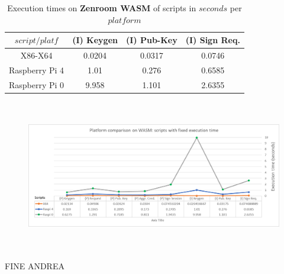 \documentclass[twocolumn]{article}
\begin{document}
\begin{table}[h!]
  \begin{center}
    \caption{Execution times on \textbf{Zenroom WASM} of scripts in $seconds$ per $platform$}
      \label{tab:table1}
        \begin{tabular} {c|c|c|c}
          \toprule
\textbf{$script / platf$} &  \textbf{(I) Keygen}& \textbf{(I) Pub-Key}& \textbf{(I) Sign Req.} \\
          \midrule
X86-X64				&		0.0204	&	0.0317	&	0.0746	\\
Raspberry Pi  4	&		1.01	&	0.276	&	0.6585	\\
Raspberry Pi  0	&		9.958	&	1.101	&	2.6355	\\
      \bottomrule %
    \end{tabular}
  \end{center}
\end{table}


\begin{figure}[h!]
    \centering
    \includegraphics[width=6in, height=2.6in]{graphs/WASMfixed.png}
    \label{fig:galaxy}
\end{figure}



\newpage





FINE ANDREA

\newpage









\listoffigures

\end{document}
